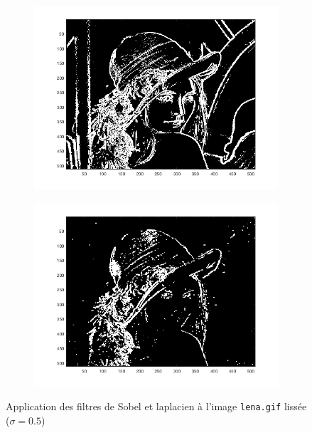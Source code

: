 \documentclass[a4paper]{article}
\begin{document}
\begin{figure}[H]
    \centering
    \begin{subfigure}[c]{0.46\textwidth}
        \centering
        \includegraphics[width=\textwidth]{images/lena_gauss_sobel.png}
    \end{subfigure}
    \begin{subfigure}[c]{0.46\textwidth}
        \centering
        \includegraphics[width=\textwidth]{images/lena_gauss_laplacien.png}
    \end{subfigure}
    \caption{Application des filtres de Sobel et laplacien à l'image
    \texttt{lena.gif} lissée ($\sigma=0.5$)}
    \label{fig:lena-lissage}
\end{figure}
\end{document}
